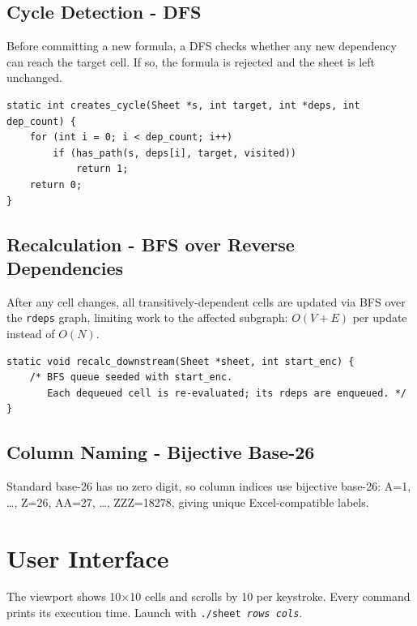 \documentclass[11pt,a4paper]{article}
\begin{document}
\subsection{Cycle Detection - DFS}

Before committing a new formula, a DFS checks whether any new dependency can reach the target cell. If so, the formula is rejected and the sheet is left unchanged.

\begin{lstlisting}[style=cstyle, caption={Cycle detection (deps.c)}]
static int creates_cycle(Sheet *s, int target, int *deps, int dep_count) {
    for (int i = 0; i < dep_count; i++)
        if (has_path(s, deps[i], target, visited))
            return 1;
    return 0;
}
\end{lstlisting}

\subsection{Recalculation - BFS over Reverse Dependencies}

After any cell changes, all transitively-dependent cells are updated via BFS over the \texttt{rdeps} graph, limiting work to the affected subgraph: $O(V + E)$ per update instead of $O(N)$.

\begin{lstlisting}[style=cstyle, caption={BFS recalculation (deps.c)}]
static void recalc_downstream(Sheet *sheet, int start_enc) {
    /* BFS queue seeded with start_enc.
       Each dequeued cell is re-evaluated; its rdeps are enqueued. */
}
\end{lstlisting}

\subsection{Column Naming - Bijective Base-26}

Standard base-26 has no zero digit, so column indices use bijective base-26: A=1, \ldots, Z=26, AA=27, \ldots, ZZZ=18278, giving unique Excel-compatible labels.

\section{User Interface}

The viewport shows 10$\times$10 cells and scrolls by 10 per keystroke. Every command prints its execution time. Launch with \texttt{./sheet \textit{rows} \textit{cols}}.
\end{document}
